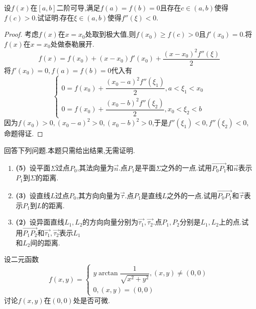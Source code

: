\documentclass{ctexart}
\begin{document}
\begin{problem}[4.(12\songti{分})]
    设$f(x)$在$[a,b]$二阶可导,满足$f(a)=f(b)=0$且存在$c\in(a,b)$使得$f(c)>0$.试证明:存在$\xi\in(a,b)$使得$f''(\xi)<0$.
\end{problem}
\begin{proof}
    考虑$f(x)$在$x=x_0$处取到极大值,则$f(x_0)\geqslant f(c)>0$且$f'(x_0)=0$.将$f(x)$在$x=x_0$处做泰勒展开.
    \[f(x)=f(x_0)+(x-x_0)f'(x_0)+\dfrac{(x-x_0)^2f''(\xi)}{2}\]
    将$f'(x_0)=0,f(a)=f(b)=0$代入有
    \[\left\{\begin{array}{l}
        0=f(x_0)+\dfrac{(x_0-a)^2f''(\xi_1)}{2},a<\xi_1<x_0 \\
        0=f(x_0)+\dfrac{(x_0-b)^2f''(\xi_2)}{2},x_0<\xi_2<b
    \end{array}\right.\]
    因为$f(x_0)>0,(x_0-a)^2>0,(x_0-b)^2>0$,于是$f''(\xi_1)<0,f''(\xi_2)<0$,命题得证.
\end{proof}
\begin{problem}[5.(10\songti{分})]
    回答下列问题.本题只需给出结果,无需证明.
    \begin{enumerate}[label=\tbf{(\arabic*)}]
        \item \textbf{(5)}\ 设平面$\Sigma$过点$P_0$,其法向量为$\vec{n}$.点$P_1$是平面$\Sigma$之外的一点.试用$\overrightarrow{P_0P_1}$和$\vec{n}$表示$P_1$到$\Sigma$的距离.
        \item \textbf{(3)}\ 设直线$L$过点$P_0$,其方向向量为$\vec{\tau}$.点$P_1$是直线$L$之外的一点.试用$\overrightarrow{P_0P_1}$和$\vec{\tau}$表示$P_1$到$L$的距离.
        \item \textbf{(2)}\ 设异面直线$L_1,L_2$的方向向量分别为$\vec{\tau_1},\vec{\tau_2}$.点$P_1,P_2$分别是$L_1,L_2$上的点.试用$\overrightarrow{P_1P_2}$和$\vec{\tau_1},\vec{\tau_2}$表示$L_1$\\和$L_2$间的距离.
    \end{enumerate}
\end{problem}
\begin{solution}
    
\end{solution}
\begin{problem}[6.(10\songti{分})]
    设二元函数\[f(x,y)=\left\{\begin{array}{l}
        y\arctan\dfrac{1}{\sqrt{x^2+y^2}},(x,y)\neq(0,0)\\
        0,(x,y)=(0,0)
    \end{array}\right.\]讨论$f(x,y)$在$(0,0)$处是否可微.
\end{problem}
\end{document}
